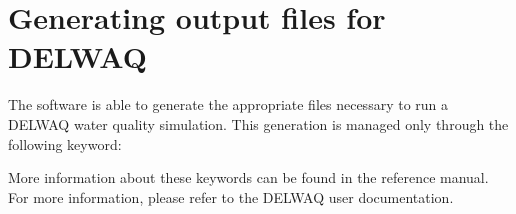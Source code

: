 \chapter{Generating output files for DELWAQ}
\label{sec:delwaq}
The  software is able to generate the appropriate files necessary to
run a DELWAQ water quality simulation. This generation is managed only
through the following keyword:


More information about these keywords can be found in the  reference
manual. For more information, please refer to the DELWAQ user documentation.

